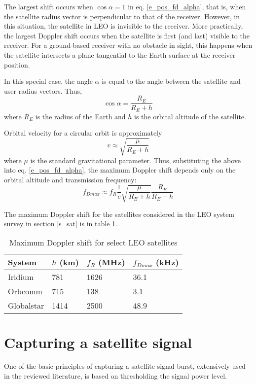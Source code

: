 The largest shift occurs when $\cos{\alpha} = 1$ in eq. \ref{e_pos_fd_alpha}, that is, when the satellite radius vector is perpendicular to that of the receiver. However, in this situation, the satellite in LEO is invisible to the receiver. More practically, the largest Doppler shift occurs when the satellite is first (and last) visible to the receiver. For a ground-based receiver with no obstacle in sight, this happens when the satellite intersects a plane tangential to the Earth surface at the receiver position.

In this special case, the angle $\alpha$ is equal to the angle between the satellite and user radius vectors. Thus,
\begin{equation*}
    \cos{\alpha} = \frac{R_E}{R_E + h}
\end{equation*}
where $R_E$ is the radius of the Earth and $h$ is the orbital altitude of the satellite.

Orbital velocity for a circular orbit is approximately
\begin{equation*}
    v \approx \sqrt{\frac{\mu}{R_E + h}}
\end{equation*}
where $\mu$ is the standard gravitational parameter. Thus, substituting the above into eq. \ref{e_pos_fd_alpha}, the maximum Doppler shift depends only on the orbital altitude and transmission frequency:
\begin{equation}
    \label{e_pos_fd_max}
    f_{D max} \approx f_R \frac{1}{c} \sqrt{\frac{\mu}{R_E + h}} \frac{R_E}{R_E + h}
\end{equation}

The maximum Doppler shift for the satellites considered in the LEO system survey in section \ref{s_sat} is in table \ref{t_pos_max_fd}.

\begin{table}
    \centering
    \begin{tabular}{llll}
    System     & $h$ (km) &  $f_R$ (MHz) & $f_{Dmax}$ (kHz) \\ \hline
    Iridium    &  781  &  1626 & \num{36.1} \\
    Orbcomm    &  715  &  138  & \num{3.1} \\
    Globalstar &  1414 &  2500 & \num{48.9}
    \end{tabular}
    \caption{Maximum Doppler shift for select LEO satellites}
    \label{t_pos_max_fd}
\end{table}



\section{Capturing a satellite signal}
\label{s_pos_tracking_satellite}
One of the basic principles of capturing a satellite signal burst, extensively used in the reviewed literature, is based on thresholding the signal power level.

